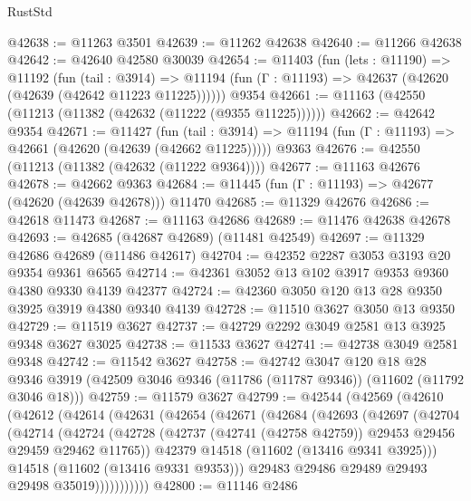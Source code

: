\begin{lexlean}{RustStd}
\begin{coremodule}
@42638 := @11263 @3501
@42639 := @11262 @42638
@42640 := @11266 @42638
@42642 := @42640 @42580 @30039
@42654 := @11403
    (fun (lets : @11190) =>
    @11192
      (fun (tail : @3914) =>
      @11194 (fun (Γ : @11193) => @42637 (@42620 (@42639 (@42642 @11223 @11225))))))
    @9354
@42661 := @11163 (@42550 (@11213 (@11382 (@42632 (@11222 (@9355 @11225))))))
@42662 := @42642 @9354
@42671 := @11427
    (fun (tail : @3914) => @11194 (fun (Γ : @11193) => @42661 (@42620 (@42639 (@42662 @11225)))))
    @9363
@42676 := @42550 (@11213 (@11382 (@42632 (@11222 @9364))))
@42677 := @11163 @42676
@42678 := @42662 @9363
@42684 := @11445 (fun (Γ : @11193) => @42677 (@42620 (@42639 @42678))) @11470
@42685 := @11329 @42676
@42686 := @42618 @11473
@42687 := @11163 @42686
@42689 := @11476 @42638 @42678
@42693 := @42685 (@42687 @42689) (@11481 @42549)
@42697 := @11329 @42686 @42689 (@11486 @42617)
@42704 := @42352 @2287 @3053 @3193 @20 @9354 @9361 @6565
@42714 := @42361 @3052 @13 @102 @3917 @9353 @9360 @4380 @9330 @4139 @42377
@42724 := @42360 @3050 @120 @13 @28 @9350 @3925 @3919 @4380 @9340 @4139
@42728 := @11510 @3627 @3050 @13 @9350
@42729 := @11519 @3627
@42737 := @42729 @2292 @3049 @2581 @13 @3925 @9348 @3627 @3025
@42738 := @11533 @3627
@42741 := @42738 @3049 @2581 @9348
@42742 := @11542 @3627
@42758 := @42742
    @3047
    @120
    @18
    @28
    @9346
    @3919
    (@42509 @3046 @9346 (@11786 (@11787 @9346)) (@11602 (@11792 @3046 @18)))
@42759 := @11579 @3627
@42799 := @42544
    (@42569
      (@42610
        (@42612
          (@42614
            (@42631
              (@42654
                (@42671
                  (@42684
                    (@42693
                      (@42697
                        (@42704
                          (@42714
                            (@42724
                              (@42728
                                (@42737
                                  (@42741 (@42758 @42759))
                                  @29453
                                  @29456
                                  @29459
                                  @29462
                                  @11765))
                              @42379
                              @14518
                              (@11602 (@13416 @9341 @3925)))
                            @14518
                            (@11602 (@13416 @9331 @9353)))
                          @29483
                          @29486
                          @29489
                          @29493
                          @29498
                          @35019)))))))))))
@42800 := @11146 @2486

\end{coremodule}
\end{lexlean}
